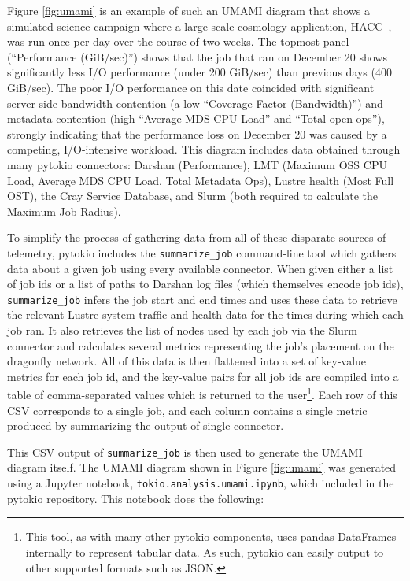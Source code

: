 Figure \ref{fig:umami} is an example of such an UMAMI diagram that shows a simulated science campaign where a large-scale cosmology application, HACC~\cite{Habib2012}, was run once per day over the course of two weeks.
The topmost panel (``Performance (GiB/sec)'') shows that the job that ran on December 20 shows significantly less I/O performance (under 200 GiB/sec) than previous days (400 GiB/sec).
The poor I/O performance on this date coincided with significant server-side bandwidth contention (a low ``Coverage Factor (Bandwidth)'') and metadata contention (high ``Average MDS CPU Load'' and ``Total open ops''), strongly indicating that the performance loss on December 20 was caused by a competing, I/O-intensive workload.
This diagram includes data obtained through many pytokio connectors: Darshan (Performance), LMT (Maximum OSS CPU Load, Average MDS CPU Load, Total Metadata Ops), Lustre health (Most Full OST), the Cray Service Database, and Slurm (both required to calculate the Maximum Job Radius).

To simplify the process of gathering data from all of these disparate sources of telemetry, pytokio includes the \texttt{summarize\_job} command-line tool which gathers data about a given job using every available connector.
When given either a list of job ids or a list of paths to Darshan log files (which themselves encode job ids), \texttt{summarize\_job} infers the job start and end times and uses these data to retrieve the relevant Lustre system traffic and health data for the times during which each job ran.
It also retrieves the list of nodes used by each job via the Slurm connector and calculates several metrics representing the job's placement on the dragonfly network.
All of this data is then flattened into a set of key-value metrics for each job id, and the key-value pairs for all job ids are compiled into a table of comma-separated values which is returned to the user\footnote{This tool, as with many other pytokio components, uses pandas DataFrames internally to represent tabular data.  As such, pytokio can easily output to other supported formats such as JSON.}.
Each row of this CSV corresponds to a single job, and each column contains a single metric produced by summarizing the output of single connector.

This CSV output of \texttt{summarize\_job} is then used to generate the UMAMI diagram itself.
The UMAMI diagram shown in Figure \ref{fig:umami} was generated using a Jupyter notebook, \texttt{tokio.analysis.umami.ipynb}, which included in the pytokio repository.
This notebook does the following:

